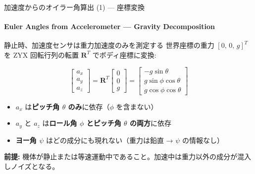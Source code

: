 \documentclass[aspectratio=169, 14pt]{beamer}
\begin{document}
\begin{frame}{加速度からのオイラー角算出 (1) --- 座標変換}
  \framesubtitle{Euler Angles from Accelerometer --- Gravity Decomposition}

  \begin{block}{静止時、加速度センサは重力加速度のみを測定する}
    {\small
    世界座標の重力 $[0,\,0,\,g]^T$ を ZYX 回転行列の転置 $\mathbf{R}^T$ でボディ座標に変換:
    }
  \end{block}

  {\small
  \[
  \begin{bmatrix} a_x \\ a_y \\ a_z \end{bmatrix}
  = \mathbf{R}^T
  \begin{bmatrix} 0 \\ 0 \\ g \end{bmatrix}
  = \begin{bmatrix}
    -g\sin\theta \\
    g\sin\phi\cos\theta \\
    g\cos\phi\cos\theta
  \end{bmatrix}
  \]
  }

  \vspace{-0.3em}

  {\small
  \begin{itemize}
    \item $a_x$ は\textbf{ピッチ角 $\theta$ のみ}に依存（$\phi$ を含まない）
    \item $a_y$ と $a_z$ は\textbf{ロール角 $\phi$ とピッチ角 $\theta$ の両方}に依存
    \item \textbf{ヨー角 $\psi$} はどの成分にも現れない（重力は鉛直 → $\psi$ の情報なし）
  \end{itemize}
  }

  \vspace{0.3em}

  {\footnotesize
  \textbf{前提:} 機体が静止または等速運動中であること。加速中は重力以外の成分が混入しノイズとなる。
  }
\end{frame}
\end{document}
